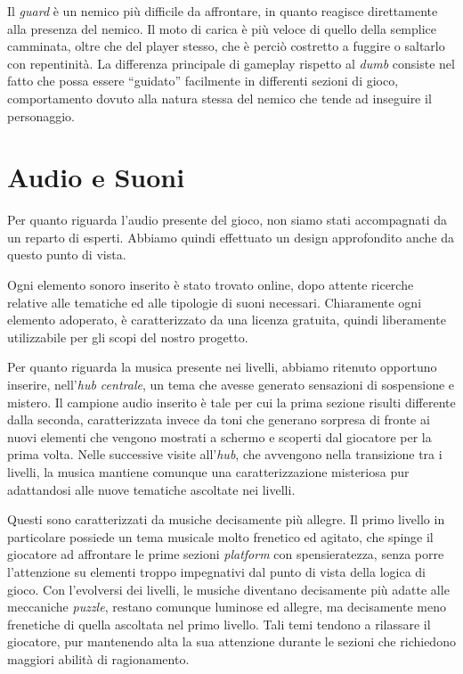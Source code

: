 Il \textit{guard} è un nemico più difficile da affrontare, in quanto reagisce direttamente alla presenza del nemico. Il moto di carica è più veloce di quello della semplice camminata, oltre che del player stesso, che è perciò costretto a fuggire o saltarlo con repentinità. La differenza principale di gameplay rispetto al \textit{dumb} consiste nel fatto che possa essere “guidato” facilmente in differenti sezioni di gioco, comportamento dovuto alla natura stessa del nemico che tende ad inseguire il personaggio.

\section{Audio e Suoni}
\label{sec:audio}

Per quanto riguarda l’audio presente del gioco, non siamo stati accompagnati da un reparto di esperti. Abbiamo quindi effettuato un design approfondito anche da questo punto di vista. 

Ogni elemento sonoro inserito è stato trovato online, dopo attente ricerche relative alle tematiche ed alle tipologie di suoni necessari. Chiaramente ogni elemento adoperato, è caratterizzato da una licenza gratuita, quindi liberamente utilizzabile per gli scopi del nostro progetto.

Per quanto riguarda la musica presente nei livelli, abbiamo ritenuto opportuno inserire, nell’\textit{hub centrale}, un tema che avesse generato sensazioni di sospensione e mistero. Il campione audio inserito è tale per cui la prima sezione risulti differente dalla seconda, caratterizzata invece da toni che generano sorpresa di fronte ai nuovi elementi che vengono mostrati a schermo e scoperti dal giocatore per la prima volta.
Nelle successive visite all’\textit{hub}, che avvengono nella transizione tra i livelli, la musica mantiene comunque una caratterizzazione misteriosa pur adattandosi alle nuove tematiche ascoltate nei livelli.

Questi sono caratterizzati da musiche decisamente più allegre. Il primo livello in particolare possiede un tema musicale molto frenetico ed agitato, che spinge il giocatore ad affrontare le prime sezioni \textit{platform} con spensieratezza, senza porre l’attenzione su elementi troppo impegnativi dal punto di vista della logica di gioco.
Con l’evolversi dei livelli, le musiche diventano decisamente più adatte alle meccaniche \textit{puzzle}, restano comunque luminose ed allegre, ma decisamente meno frenetiche di quella ascoltata nel primo livello. Tali temi tendono a rilassare il giocatore, pur mantenendo alta la sua attenzione durante le sezioni che richiedono maggiori abilità di ragionamento.

